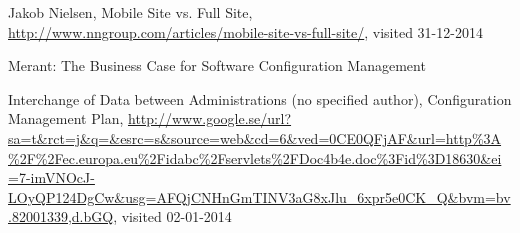 \documentclass[10pt]{article}
\begin{document}
\begin{thebibliography}{1}
 Jakob Nielsen, Mobile Site vs. Full Site, \url{http://www.nngroup.com/articles/mobile-site-vs-full-site/}, visited 31-12-2014

 Merant: The Business Case for Software Configuration Management

 Interchange of Data between Administrations (no specified author), Configuration Management Plan, \url{http://www.google.se/url?sa=t&rct=j&q=&esrc=s&source=web&cd=6&ved=0CE0QFjAF&url=http\%3A\%2F\%2Fec.europa.eu\%2Fidabc\%2Fservlets\%2FDoc4b4e.doc\%3Fid\%3D18630&ei=7-imVNOcJ-LOyQP124DgCw&usg=AFQjCNHnGmTINV3aG8xJlu_6xpr5e0CK_Q&bvm=bv.82001339,d.bGQ}, visited 02-01-2014 

\end{thebibliography}
\end{document}
